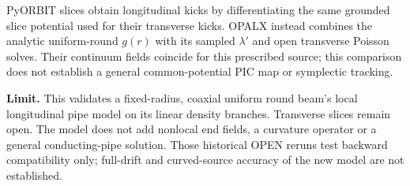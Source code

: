PyORBIT slices obtain longitudinal kicks by differentiating the same grounded
slice potential used for their transverse kicks. OPALX instead combines the
analytic uniform-round $g(r)$ with its sampled $\lambda'$ and open transverse
Poisson solves. Their continuum fields coincide for this prescribed source;
this comparison does not establish a general common-potential PIC map or
symplectic tracking.

\textbf{Limit.} This validates a fixed-radius, coaxial uniform round beam's
local longitudinal pipe model on its linear density branches. Transverse
slices remain open. The model does not add nonlocal end fields, a curvature
operator or a general conducting-pipe solution. Those historical OPEN reruns test backward
compatibility only; full-drift and curved-source accuracy of the new
 model are not established.
